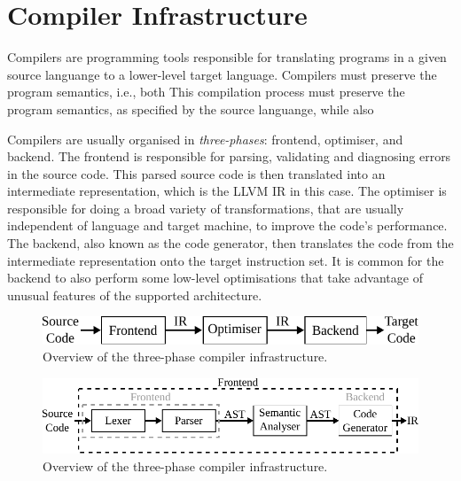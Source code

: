 
\section{Compiler Infrastructure}

Compilers are programming tools responsible for translating programs in a given source languange to a lower-level target language.
Compilers must preserve the program semantics, i.e., both 
This compilation process must preserve the program semantics, as specified by the source languange, while also 

Compilers are usually organised in \textit{three-phases}: frontend, optimiser, and backend.
The frontend is responsible for parsing, validating and diagnosing errors in the source code.
This parsed source code is then translated into an intermediate representation, which is the LLVM IR in this case.
The optimiser is responsible for doing a broad variety of transformations, that are usually independent of language and target machine, to improve the code's performance.
The backend, also known as the code generator, then translates the code from the intermediate representation onto the target instruction set.
It is common for the backend to also perform some low-level optimisations that take advantage of unusual features of the supported architecture.

\begin{figure}[h]
  \centering
  \includegraphics[scale=0.9]{src/background/figs/3-phase-compiler.pdf}
  \caption{Overview of the three-phase compiler infrastructure.}
  \label{fig:3-phase-compiler}
\end{figure}


\begin{figure}[h]
  \centering
  \includegraphics[scale=0.9]{src/background/figs/compiler-frontend.pdf}
  \caption{Overview of the three-phase compiler infrastructure.}
  \label{fig:compiler-frontend}
\end{figure}

